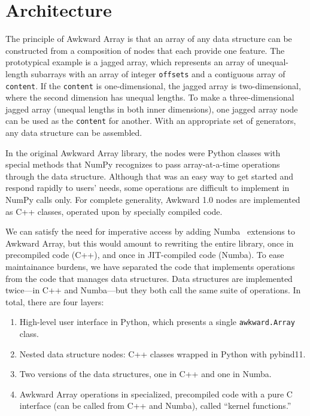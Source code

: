 \documentclass{webofc}
\begin{document}
\section{Architecture}

The principle of Awkward Array is that an array of any data structure can be constructed from a composition of nodes that each provide one feature. The prototypical example is a jagged array, which represents an array of unequal-length subarrays with an array of integer \texttt{offsets} and a contiguous array of \texttt{content}. If the \texttt{content} is one-dimensional, the jagged array is two-dimensional, where the second dimension has unequal lengths. To make a three-dimensional jagged array (unequal lengths in both inner dimensions), one jagged array node can be used as the \texttt{content} for another. With an appropriate set of generators, any data structure can be assembled.

In the original Awkward Array library, the nodes were Python classes with special methods that NumPy recognizes to pass array-at-a-time operations through the data structure. Although that was an easy way to get started and respond rapidly to users' needs, some operations are difficult to implement in NumPy calls only. For complete generality, Awkward 1.0 nodes are implemented as C++ classes, operated upon by specially compiled code.

We can satisfy the need for imperative access by adding Numba~\cite{numba} extensions to Awkward Array, but this would amount to rewriting the entire library, once in precompiled code (C++), and once in JIT-compiled code (Numba). To ease maintainance burdens, we have separated the code that implements operations from the code that manages data structures. Data structures are implemented twice---in C++ and Numba---but they both call the same suite of operations. In total, there are four layers:

\begin{enumerate}
\item High-level user interface in Python, which presents a single \texttt{awkward.Array} class.
\item Nested data structure nodes: C++ classes wrapped in Python with pybind11.
\item Two versions of the data structures, one in C++ and one in Numba.
\item Awkward Array operations in specialized, precompiled code with a pure C interface (can be called from C++ and Numba), called ``kernel functions.''
\end{enumerate}
\end{document}
